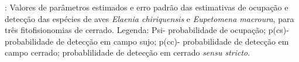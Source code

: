 \label{fig:aves6}: Valores de parâmetros estimados e erro padrão das estimativas de ocupação e detecção das espécies de aves \textit{Elaenia chiriquensis} e \textit{Eupetomena macroura}, para três fitofisionomias de cerrado. Legenda: Psi- probabilidade de ocupação; p(cs)- probabilidade de detecção em campo sujo; p(cc)- probabilidade de detecção em campo cerrado; probablilidade de detecção em cerrado \textit{sensu stricto}.